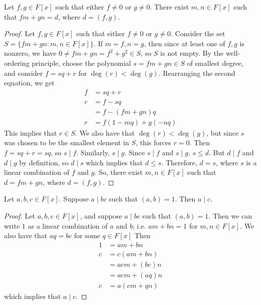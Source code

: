 \documentclass [12pt] {article}
\newenvironment{theorem}[1]{\begin{tcolorbox}[title={Theorem #1},colback=green!5!white,colframe=black!75!green]}{\end{tcolorbox}}
\begin{document}
\begin{theorem}{(Bezout's Identity [Polynomials])}
    Let $f, g \in F[x]$ such that either $f \neq 0$ or $g \neq 0$. There exist $m, n \in F[x]$ such
    that $fm + gn = d$, where $d = (f, g)$.
\end{theorem}
\begin{proof}
    Let $f, g \in F[x]$ such that either $f \neq 0$ or $g \neq 0$. Consider the set
    $S = \{ fm + gn : m, n \in F[x] \}$. If $m = f, n = g$, then since at least one of $f, g$ is
    nonzero, we have $0 \neq fm + gn = f^2 + g^2 \in S$, so $S$ is not empty. By the well-ordering
    principle, choose the polynomial $s = fm + gn \in S$ of smallest degree, and consider
    $f = sq + r$ for $\deg(r) < \deg(g)$. Rearranging the second equation, we get
    \begin{align*}
        f &= sq + r \\
        r &= f - sq \\
        &= f - (fm + gn)q \\
        r &= f(1 - mq) + g(-nq)
    \end{align*}
    This implies that $r \in S$. We also have that $\deg(r) < \deg(g)$, but since $s$ was chosen to
    be the smallest element in $S$, this forces $r = 0$. Then $f = sq + r = sq$, so $s \mid f$.
    Similarly, $s \mid g$. Since $s \mid f$ and $s \mid g$, $s \leq d$. But $d \mid f$ and
    $d \mid g$ by definition, so $d \mid s$ which implies that $d \leq s$. Therefore,
    $d = s$, where $s$ is a linear combination of $f$ and $g$. So, there exist $m, n \in F[x]$
    such that $d = fm + gn$, where $d = (f, g)$.
\end{proof}

\begin{theorem}{}
    Let $a, b, c \in F[x]$. Suppose $a \mid bc$ such that $(a, b) = 1$. Then $a \mid c$.
\end{theorem}
\begin{proof}
    Let $a, b, c \in F[x]$, and suppose $a \mid bc$ such that $(a, b) = 1$. Then we can write $1$ as
    a linear combination of $a$ and $b$; i.e. $am + bn = 1$ for $m, n \in F[x]$. We also have that
    $aq = bc$ for some $q \in F[x]$ Then
    \begin{align*}
        1 &= am + bn \\
        c &= c(am + bn) \\
          &= acm + (bc)n \\
          &= acm + (aq)n \\
        c &= a(cm + qn)
    \end{align*}
    which implies that $a \mid c$.
\end{proof}
\end{document}

